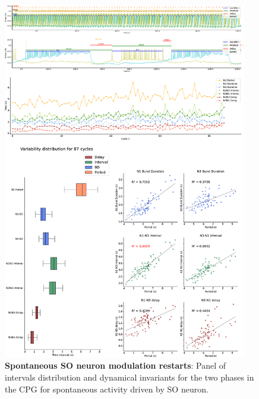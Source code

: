 \begin{figure}[htbp]
	\centering
	\includegraphics[width=0.95\textwidth]{./invariants/data/SUSSEX/prep4_so_driven_2/images/panel_with_intervals.pdf}
	\caption{\textbf{Spontaneous SO neuron modulation restarts}: Panel of intervals distribution and dynamical invariants for the two phases in the CPG for spontaneous activity driven by SO neuron.}
	\label{fig:so spontaneous invariants 1}
\end{figure}



